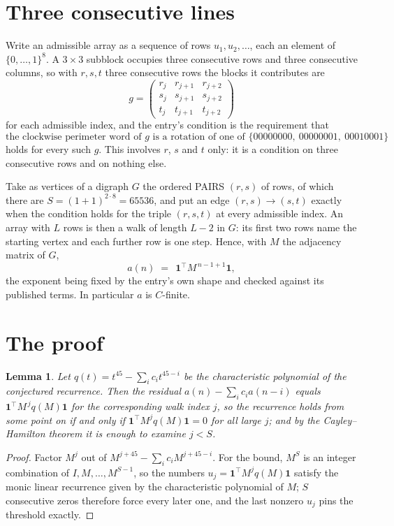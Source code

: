 \documentclass[11pt,a4paper]{article}
\theoremstyle{plain}
\newtheorem{lemma}[theorem]{Lemma}
\theoremstyle{definition}
\begin{document}
\section{Three consecutive lines}

Write an admissible array as a sequence of rows $u_1,u_2,\dots$, each an element of
$\{0,\dots,1\}^{8}$. A $3\times3$ subblock occupies three consecutive rows and
three consecutive columns, so with $r,s,t$ three consecutive rows the blocks it
contributes are
\[
g=\begin{pmatrix}r_j&r_{j+1}&r_{j+2}\\ s_j&s_{j+1}&s_{j+2}\\ t_j&t_{j+1}&t_{j+2}\end{pmatrix}
\]
for each admissible index, and the entry's condition is the requirement that
\[
\text{the clockwise perimeter word of }g\text{ is a rotation of one of }\{00000000,\ 00000001,\ 00010001\}
\]
holds for every such $g$. This involves $r$, $s$ and $t$ only: it is a condition on
three consecutive rows and on nothing else.

Take as vertices of a digraph $G$ the ordered PAIRS $(r,s)$ of rows, of which there are
$S=(1+1)^{2\cdot8}=65536$, and put an edge $(r,s)\to(s,t)$ exactly when the condition
holds for the triple $(r,s,t)$ at every admissible index. An array with $L$ rows is then a
walk of length $L-2$ in $G$: its first two rows name the starting vertex and each further
row is one step. Hence, with $M$ the adjacency matrix of $G$,
\[
a(n)\;=\;\,\mathbf{1}^{\!\top}M^{\,n-1+1}\mathbf{1},
\]
the exponent being fixed by the entry's own shape and checked against its published terms.
In particular $a$ is $C$-finite.

\section{The proof}

\begin{lemma}\label{lem:crit}
Let $q(t)=t^{45}-\sum_i c_it^{45-i}$ be the characteristic polynomial of the
conjectured recurrence. Then the residual $a(n)-\sum_ic_ia(n-i)$ equals
$\mathbf{1}^{\!\top}M^{\,j}q(M)\mathbf{1}$ for the corresponding walk index
$j$, so the recurrence holds from some point on if and only if
$\mathbf{1}^{\!\top}M^{j}q(M)\mathbf{1}=0$ for all large $j$; and by the
Cayley--Hamilton theorem it is enough to examine $j<S$.
\end{lemma}

\begin{proof}
Factor $M^{j}$ out of $M^{j+45}-\sum_ic_iM^{j+45-i}$. For the bound, $M^{S}$
is an integer combination of $I,M,\dots,M^{S-1}$, so the numbers
$u_j=\mathbf{1}^{\!\top}M^{j}q(M)\mathbf{1}$ satisfy the monic linear recurrence given by
the characteristic polynomial of $M$; $S$ consecutive zeros therefore force every later one,
and the last nonzero $u_j$ pins the threshold exactly.
\end{proof}
\end{document}
